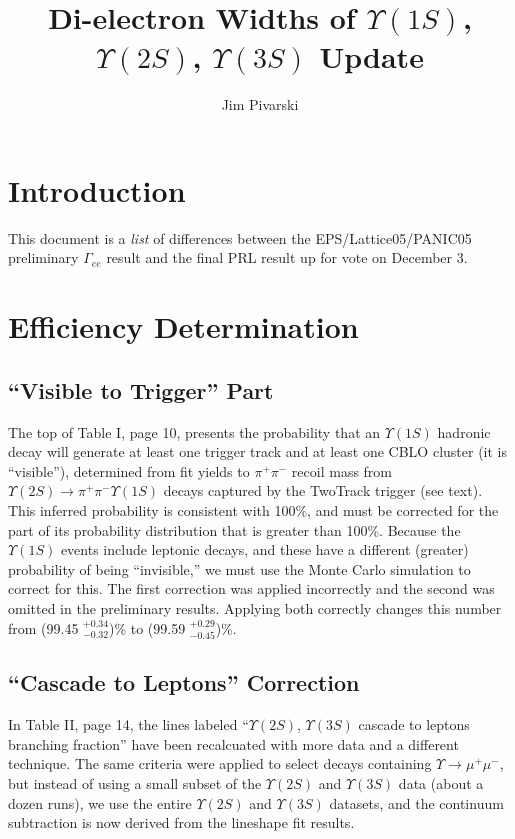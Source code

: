 \documentclass[12pt]{article}
\title{Di-electron Widths of $\Upsilon(1S)$, $\Upsilon(2S)$, $\Upsilon(3S)$ Update}
\author{Jim Pivarski}
\begin{document}
\maketitle

\setcounter{section}{-1}
\section{Introduction}

This document is a {\it list} of differences between the
EPS/Lattice05/PANIC05 preliminary $\Gamma_{ee}$ result and the final
PRL result up for vote on December 3.

\section{Efficiency Determination}

\subsection{``Visible to Trigger'' Part}

The top of Table I, page 10, presents the probability that an
$\Upsilon(1S)$ hadronic decay will generate at least one trigger track
and at least one CBLO cluster (it is ``visible''), determined from fit
yields to $\pi^+\pi^-$ recoil mass from $\Upsilon(2S) \to \pi^+\pi^-
\Upsilon(1S)$ decays captured by the TwoTrack trigger (see text).
This inferred probability is consistent with 100\%, and must be
corrected for the part of its probability distribution that is greater
than 100\%.  Because the $\Upsilon(1S)$ events include leptonic
decays, and these have a different (greater) probability of being
``invisible,'' we must use the Monte Carlo simulation to correct for
this.  The first correction was applied incorrectly and the second was
omitted in the preliminary results.  Applying both correctly changes
this number from (99.45 $^{+0.34}_{-0.32}$)\% to (99.59
$^{+0.29}_{-0.45}$)\%.

\subsection{``Cascade to Leptons'' Correction}

In Table II, page 14, the lines labeled ``$\Upsilon(2S)$,
$\Upsilon(3S)$ cascade to leptons branching fraction'' have been
recalcuated with more data and a different technique.  The same
criteria were applied to select decays containing $\Upsilon \to
\mu^+\mu^-$, but instead of using a small subset of the $\Upsilon(2S)$
and $\Upsilon(3S)$ data (about a dozen runs), we use the entire
$\Upsilon(2S)$ and $\Upsilon(3S)$ datasets, and the continuum
subtraction is now derived from the lineshape fit results.
\end{document}

